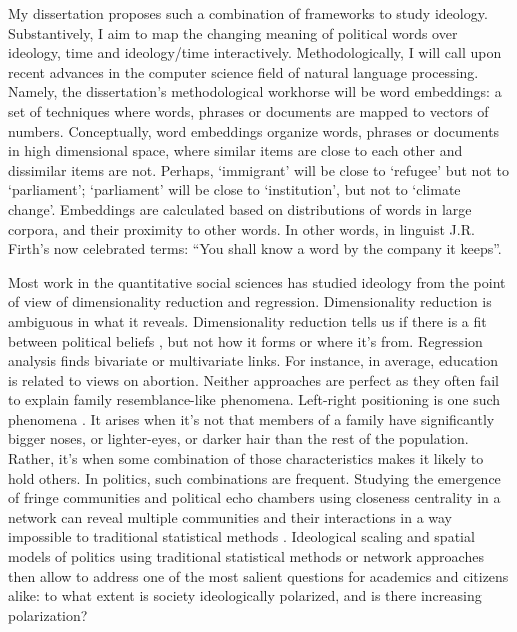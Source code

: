 \documentclass[
  openany]{book}
\begin{document}
My dissertation proposes such a combination of frameworks to study ideology. Substantively, I aim to map the changing meaning of political words over ideology, time and ideology/time interactively. Methodologically, I will call upon recent advances in the computer science field of natural language processing. Namely, the dissertation's methodological workhorse will be word embeddings: a set of techniques where words, phrases or documents are mapped to vectors of numbers. Conceptually, word embeddings organize words, phrases or documents in high dimensional space, where similar items are close to each other and dissimilar items are not. Perhaps, `immigrant' will be close to `refugee' but not to `parliament'; `parliament' will be close to `institution', but not to `climate change'. Embeddings are calculated based on distributions of words in large corpora, and their proximity to other words. In other words, in linguist J.R. Firth's \citeyearpar{firth1957papers} now celebrated terms: ``You shall know a word by the company it keeps''.

Most work in the quantitative social sciences has studied ideology from the point of view of dimensionality reduction and regression. Dimensionality reduction is ambiguous in what it reveals. Dimensionality reduction tells us if there is a fit between political beliefs \citep{gregg1965dimensions}, but not how it forms or where it's from. Regression analysis finds bivariate or multivariate links. For instance, in average, education is related to views on abortion. Neither approaches are perfect as they often fail to explain family resemblance-like phenomena. Left-right positioning is one such phenomena \citep{cochrane2015left}. It arises when it's not that members of a family have significantly bigger noses, or lighter-eyes, or darker hair than the rest of the population. Rather, it's when some combination of those characteristics makes it likely to hold others. In politics, such combinations are frequent. Studying the emergence of fringe communities and political echo chambers using closeness centrality in a network can reveal multiple communities and their interactions in a way impossible to traditional statistical methods \citep{boutyline2017social}. Ideological scaling and spatial models of politics using traditional statistical methods or network approaches then allow to address one of the most salient questions for academics and citizens alike: to what extent is society ideologically polarized, and is there increasing polarization?
\end{document}

